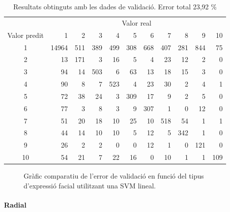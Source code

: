 \documentclass[a4paper]{article}
\begin{document}
\begin{table}[H]
	\centering
	\def\arraystretch{1.2}
	\begin{tabular}{|c|rrrrrrrrrr|}
		\hline
		& \multicolumn{10}{c|}{Valor real} \\
		Valor predit & 1 & 2 & 3 & 4 & 5 & 6 & 7 & 8 & 9 & 10 \\
		\hline
		1 & 14964 & 511 & 389 & 499 & 308 & 668 & 407 & 281 & 844 & 75 \\
		2 & 13 & 171 & 3 & 16 & 5 & 4 & 23 & 12 & 2 & 0 \\
		3 & 94 & 14 & 503 & 6 & 63 & 13 & 18 & 15 & 3 & 0 \\
		4 & 90 & 8 & 7 & 523 & 4 & 23 & 30 & 2 & 4 & 1 \\
		5 & 72 & 38 & 24 & 3 & 309 & 17 & 9 & 2 & 5 & 0 \\
		6 & 77 & 3 & 8 & 3 & 9 & 307 & 1 & 0 & 12 & 0 \\
		7 & 51 & 20 & 18 & 10 & 25 & 10 & 518 & 54 & 1 & 1 \\
		8 & 44 & 14 & 10 & 10 & 5 & 12 & 5 & 342 & 1 & 0 \\
		9 & 26 & 2 & 2 & 0 & 0 & 12 & 1 & 0 & 121 & 0 \\
		10 & 54 & 21 & 7 & 22 & 16 & 0 & 10 & 1 & 1 & 109 \\
		\hline
	\end{tabular}
	\caption{Resultats obtinguts amb les dades de validació. Error total 23,92 \%}
	\label{tab:svm_lineal_k2}
\end{table}

\begin{figure}[H]
	\centering
	\captionsetup{width=0.8\textwidth}
	\caption{Gràfic comparatiu de l'error de validació en funció del tipus d'expressió facial utilitzant una SVM lineal.}
\end{figure}

\paragraph{Radial}
\end{document}
